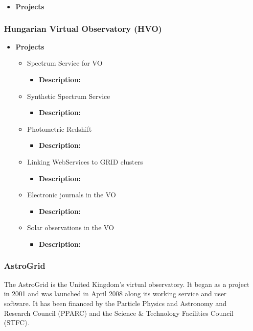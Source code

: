 \begin{itemize}
\item \textbf{Projects}
\end{itemize}

\subsubsection{Hungarian Virtual Observatory (HVO)}
\begin{itemize}
\item \textbf{Projects}
\begin{itemize}
\item Spectrum Service for VO
\begin{itemize}
\item \textbf{Description:}
\end{itemize}
\item Synthetic Spectrum Service
\begin{itemize}
\item \textbf{Description:}
\end{itemize}
\item Photometric Redshift
\begin{itemize}
\item \textbf{Description:}
\end{itemize}
\item Linking WebServices to GRID clusters
\begin{itemize}
\item \textbf{Description:}
\end{itemize}
\item Electronic journals in the VO
\begin{itemize}
\item \textbf{Description:}
\end{itemize}
\item Solar observations in the VO
\begin{itemize}
\item \textbf{Description:}
\end{itemize}
\end{itemize}
\end{itemize}

\subsubsection{AstroGrid}
The AstroGrid is the United Kingdom's virtual observatory. It began as a project
in 2001 and was launched in April 2008 along its working service and user
software. It has been financed by the Particle Physics and Astronomy and
Research Council (PPARC) and the Science \& Technology Facilities Council
(STFC).

